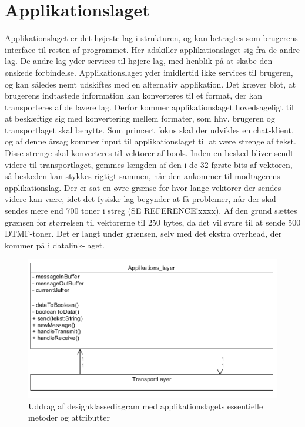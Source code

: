 \section{Applikationslaget}
Applikationslaget er det højeste lag i strukturen, og kan betragtes som brugerens interface til resten af programmet. Her adskiller applikationslaget sig fra de andre lag. De andre lag yder services til højere lag, med henblik på at skabe den ønskede forbindelse. Applikationslaget yder imidlertid ikke services til brugeren, og kan således nemt udskiftes med en alternativ applikation. Det kræver blot, at brugerens indtastede information kan konverteres til et format, der kan transporteres af de lavere lag.
	Derfor kommer applikationslaget hovedsageligt til at beskæftige sig med konvertering mellem formater, som hhv. brugeren og transportlaget skal benytte. Som primært fokus skal der udvikles en chat-klient, og af denne årsag kommer input til applikationslaget til at være strenge af tekst. Disse strenge skal konverteres til vektorer af bools. Inden en besked bliver sendt videre til transportlaget, gemmes længden af den i de 32 første bits af vektoren, så beskeden kan stykkes rigtigt sammen, når den ankommer til modtagerens applikationslag. Der er sat en øvre grænse for hvor lange vektorer der sendes videre kan være, idet det fysiske lag begynder at få problemer, når der skal sendes mere end 700 toner i streg (SE REFERENCE!xxxx). Af den grund sættes grænsen for størrelsen til vektorerne til 250 bytes, da det vil svare til at sende 500 DTMF-toner. Det er langt under grænsen, selv med det ekstra overhead, der kommer på i datalink-laget.
	
	
\begin{figure}[h]
\centering
\includegraphics[scale=0.6]{Billeder/ApplicationLayerDesignClass.PNG}
\caption{Uddrag af designklassediagram med applikationslagets essentielle metoder og attributter}
\label{fig:AppLayerDesign}
\end{figure}
	

